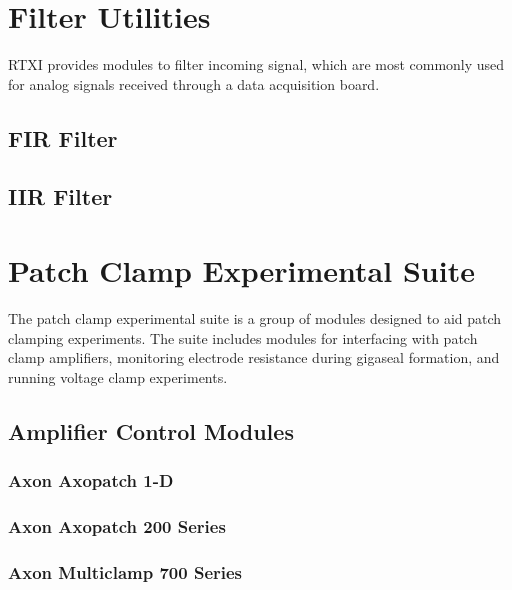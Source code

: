 \clearpage
\section{Filter Utilities}
RTXI provides modules to filter incoming signal, which are most commonly used for analog signals received through a data acquisition board. 

\subsection{FIR Filter}


\subsection{IIR Filter}


\clearpage
\section{Patch Clamp Experimental Suite}
\label{patchclampsuite}
The patch clamp experimental suite is a group of modules designed to aid  patch clamping experiments. The suite includes modules for interfacing with patch clamp amplifiers, monitoring electrode resistance during gigaseal formation, and running voltage clamp experiments.

\subsection{Amplifier Control Modules}


%

\subsubsection{Axon Axopatch 1-D}


\subsubsection{Axon Axopatch 200 Series}


\subsubsection{Axon Multiclamp 700 Series}



